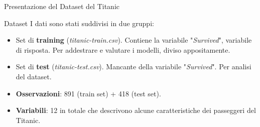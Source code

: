 \documentclass[9pt, xcolor=table]{beamer}
\begin{document}
	\begin{frame}{Presentazione del Dataset del Titanic}
		\begin{block}{Dataset}
			I dati sono stati suddivisi in due gruppi:
			\begin{itemize}
				\item Set di \textbf{training} (\textit{titanic-train.csv}). Contiene la variabile
				"\textit{Survived}", variabile di risposta. Per addestrare e valutare i
				modelli, diviso appositamente.
				\item Set di \textbf{test} (\textit{titanic-test.csv}). Mancante della variabile
				"\textit{Survived}". Per analisi del dataset.
				\item \textbf{Osservazioni}: 891 (train set) + 418 (test set).
				\item \textbf{Variabili}: 12 in totale che descrivono alcune caratteristiche
				dei passeggeri del Titanic.
			\end{itemize}
		\end{block}
	
		\begin{table}[]
		\end{table}
	\end{frame}
\end{document}
